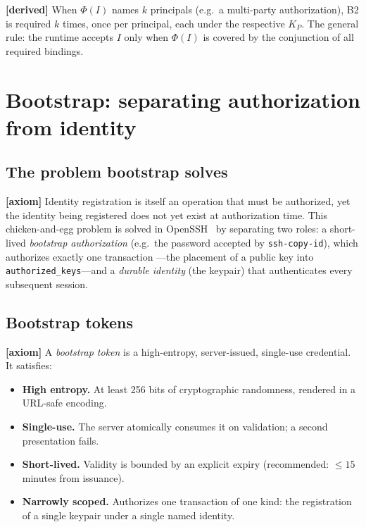 \documentclass[11pt,a4paper]{article}
\newcommand{\axiom}{\textcolor{axiomcolor}{\textbf{[axiom]}}\xspace}
\newcommand{\derived}{\textcolor{derivedcolor}{\textbf{[derived]}}\xspace}
\begin{document}
\derived{} When $\Phi(I)$ names $k$ principals (e.g.\ a multi-party
authorization), B2 is required $k$ times, once per principal, each
under the respective $K_P$. The general rule: the runtime accepts $I$
only when $\Phi(I)$ is covered by the conjunction of all required
bindings.

\section{Bootstrap: separating authorization from identity}
\label{sec:bootstrap}

\subsection{The problem bootstrap solves}

\axiom{} Identity registration is itself an operation that must be
authorized, yet the identity being registered does not yet exist at
authorization time. This chicken-and-egg problem is solved in
OpenSSH~\cite{rfc4252} by separating two roles: a short-lived
\emph{bootstrap authorization} (e.g.\ the password accepted by
\texttt{ssh-copy-id}), which authorizes exactly one transaction
---the placement of a public key into
\texttt{authorized\_keys}---and a \emph{durable identity} (the
keypair) that authenticates every subsequent session.

\subsection{Bootstrap tokens}

\axiom{} A \emph{bootstrap token} is a high-entropy, server-issued,
single-use credential. It satisfies:

\begin{itemize}[leftmargin=2em,itemsep=0.15em]
    \item \textbf{High entropy.} At least 256 bits of cryptographic
    randomness, rendered in a URL-safe encoding.
    \item \textbf{Single-use.} The server atomically consumes it on
    validation; a second presentation fails.
    \item \textbf{Short-lived.} Validity is bounded by an explicit
    expiry (recommended: $\le 15$ minutes from issuance).
    \item \textbf{Narrowly scoped.} Authorizes one transaction of one
    kind: the registration of a single keypair under a single named
    identity.
\end{itemize}
\end{document}
